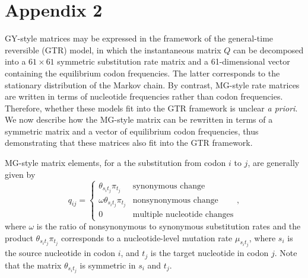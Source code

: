 \documentclass[11pt]{article}
\begin{document}
\section*{Appendix 2}
GY-style matrices may be expressed in the framework of the general-time reversible (GTR) model, in which the instantaneous matrix $Q$ can be decomposed into a $61 \times 61$ symmetric substitution rate matrix and a 61-dimensional vector containing the equilibrium codon frequencies. The latter corresponds to the stationary distribution of the Markov chain. By contrast, MG-style rate matrices are written in terms of nucleotide frequencies rather than codon frequencies. Therefore, whether these models fit into the GTR framework is unclear \emph{a priori}. We now describe how the MG-style matrix can be rewritten in terms of a symmetric matrix and a vector of equilibrium codon frequencies, thus demonstrating that these matrices also fit into the GTR framework.
 
MG-style matrix elements, for a the substitution from codon $i$ to $j$, are generally given by 
\begin{equation}\label{eq:MGstyle}
q_{ij} = \left\{ 
\begin{array}{rl}
\theta_{s_it_j}\pi_{t_j}          &\text{synonymous change} \\
\omega \theta_{s_it_j}\pi_{t_j}   &\text{nonsynonymous change} \\
0                             &\text{multiple nucleotide changes}       
\end{array} \right. ,
\end{equation} where $\omega$ is the ratio of nonsynonymous to synonymous substitution rates and the product $\theta_{s_it_j}\pi_{t_j}$ corresponds to a nucleotide-level mutation rate $\mu_{s_it_j}$, where $s_i$ is the source nucleotide in codon $i$, and $t_j$ is the target nucleotide in codon $j$. Note that the matrix $\theta_{s_it_j}$ is symmetric in $s_i$ and $t_j$.
\end{document}
